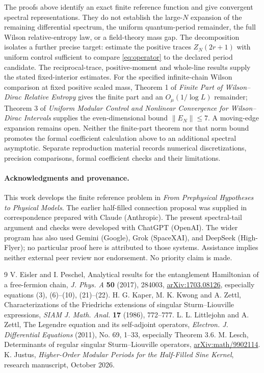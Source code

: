 \documentclass[10pt]{article}
\begin{document}
The proofs above identify an exact finite reference function and
give convergent spectral representations. They do not establish
the large-$N$ expansion of the remaining differential spectrum, the
uniform quantum-period remainder, the full Wilson relative-entropy
law, or a field-theory mass gap.
The decomposition isolates a further precise target: estimate the
positive traces $Z_N(2r+1)$ with uniform control sufficient to
compare \eqref{eq:operator} to the declared period candidate.
The reciprocal-trace, positive-moment and whole-line results supply the
stated fixed-interior estimates. For the specified infinite-chain Wilson
comparison at fixed positive scaled mass, Theorem 1 of \emph{Finite Part
of Wilson--Dirac Relative Entropy} gives the finite part and an
\(O_\mu(1/\log L)\) remainder; Theorem 3 of \emph{Uniform Modular
Control and Nonlinear Convergence for Wilson--Dirac Intervals} supplies
the even-dimensional bound \(\|E_N\|\le7\). A moving-edge expansion
remains open. Neither the finite-part theorem nor that norm bound
promotes the formal coefficient calculation above to an additional
spectral asymptotic.
Separate reproduction material records numerical discretizations,
precision comparisons, formal coefficient checks and their limitations.

\paragraph{Acknowledgments and provenance.}
This work develops the finite reference problem in
\emph{From Prephysical Hypotheses to Physical Models}.
The earlier half-filled connection proposal was supplied in
correspondence prepared with Claude (Anthropic).
The present spectral-tail argument and checks were developed with
ChatGPT (OpenAI). The wider program has also used Gemini (Google),
Grok (SpaceXAI), and DeepSeek (High-Flyer); no particular proof here
is attributed to those systems. Assistance implies neither
external peer review nor endorsement. No priority claim is made.

\begin{thebibliography}{9}
 V. Eisler and I. Peschel, Analytical results for the
entanglement Hamiltonian of a free-fermion chain,
\emph{J. Phys. A} \textbf{50} (2017), 284003,
\href{https://arxiv.org/abs/1703.08126}{arXiv:1703.08126},
especially equations (3), (6)--(10), (21)--(22).
 H. G. Kaper, M. K. Kwong and A. Zettl,
Characterizations of the Friedrichs extensions of singular
Sturm--Liouville expressions,
\emph{SIAM J. Math. Anal.} \textbf{17} (1986), 772--777.
 L. L. Littlejohn and A. Zettl,
The Legendre equation and its self-adjoint operators,
\emph{Electron. J. Differential Equations} (2011), No. 69, 1--33,
especially Theorem 3.6.
 M. Lesch, Determinants of regular singular
Sturm--Liouville operators,
\href{https://arxiv.org/abs/math/9902114}{arXiv:math/9902114}.
 K. Justus,
\emph{Higher-Order Modular Periods for the Half-Filled Sine Kernel},
research manuscript, October 2026.
\end{thebibliography}
\end{document}
